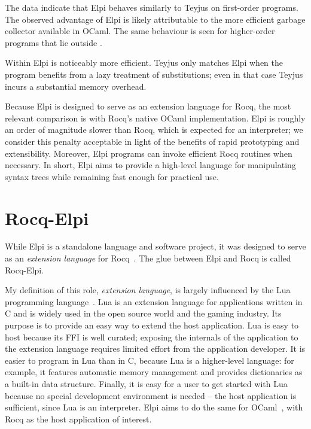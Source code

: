 \documentclass{these-ISSS}
\begin{document}
The data indicate that Elpi behaves similarly to Teyjus on first-order
programs. The observed advantage of Elpi is likely attributable to the more
efficient garbage collector available in OCaml. The same behaviour is seen
for higher-order programs that lie outside \thefragment{}.

Within \thefragment{} Elpi is noticeably more efficient. Teyjus only
matches Elpi when the program benefits from a lazy treatment of
substitutions; even in that case Teyjus incurs a substantial memory
overhead.

Because Elpi is designed to serve as an extension language for Rocq, the
most relevant comparison is with Rocq's native OCaml implementation. Elpi
is roughly an order of magnitude slower than Rocq, which is expected for an
interpreter; we consider this penalty acceptable in light of the benefits of
rapid prototyping and extensibility. Moreover, Elpi programs can invoke
efficient Rocq routines when necessary. In short, Elpi aims to provide a
high-level language for manipulating syntax trees while remaining fast
enough for practical use.


\chapter{Rocq-Elpi}\label{sec:rocq}


While Elpi is a standalone language and software project, it was designed to
serve as an \emph{extension language} for Rocq~\cite{Coq-refman}.
The glue between Elpi and Rocq is called Rocq-Elpi.

My definition of this role, \emph{extension language}, is largely influenced by
the Lua programming language~\cite{10.5555/1200583}. Lua is an extension
language for applications written in C and is widely used in the open source
world and the gaming industry. Its purpose is to provide an easy way to extend
the host application. Lua is easy to host because its FFI is well curated;
exposing the internals of the application to the extension language requires
limited effort from the application developer. It is easier to program in Lua
than in C, because Lua is a higher-level language: for example, it features
automatic memory management and provides dictionaries as a built-in data
structure. Finally, it is easy for a user to get started with Lua because no
special development environment is needed -- the host application is sufficient,
since Lua is an interpreter.
Elpi aims to do the same for OCaml~\cite{leroy3ocaml}, with Rocq as the
host application of
interest.
\end{document}
